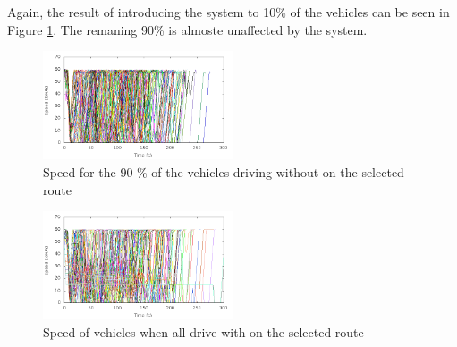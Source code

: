 Again, the result of introducing the system to 10\% of the vehicles can be seen in Figure \ref{fig:TestResults:speedUnC10}. 
The remaning 90\% is almoste unaffected by the system.

\begin{figure}[H]
\includegraphics[width=0.5\textwidth]{../images/tp0/speedUncontrolled10.png}
\caption{Speed for the 90 \% of the vehicles driving without \tech on the selected route}
\label{fig:TestResults:speedUnC10}
\end{figure}

\begin{figure}[H]
\includegraphics[width=0.5\textwidth]{../images/tp0/speedControlled100.png}
\caption{Speed of vehicles when all drive with \tech on the selected route}
\label{fig:TestResults:speed100}
\end{figure}
